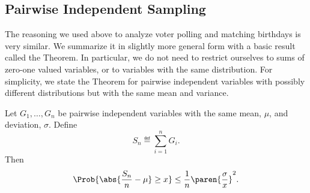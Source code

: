 
\subsection{Pairwise Independent Sampling}

The reasoning we used above to analyze voter polling and matching
birthdays is very similar.  We summarize it in slightly more general form
with a basic result called the 
Theorem.  In particular, we do not need to restrict ourselves to sums of
zero-one valued variables, or to variables with the same distribution.
For simplicity, we state the Theorem for pairwise independent variables
with possibly different distributions but with the same mean and variance.

\begin{theorem}\label{th:pairwise-sampling}
Let $G_1, \dots, G_n$ be pairwise independent variables with the same
mean, $\mu$, and deviation, $\sigma$.  Define
\begin{equation}\label{ln14.Sn}
S_n \eqdef \sum_{i=1}^n G_i.
\end{equation}
Then
\[
\Prob{\abs{\frac{S_n}{n} - \mu} \geq x}
    \leq \frac{1}{n} \paren{\frac{\sigma}{x}}^2.
\]
\end{theorem}


